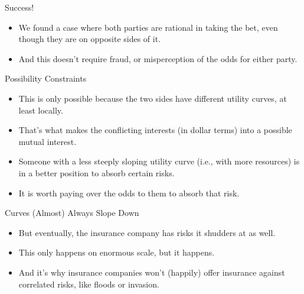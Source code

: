 \documentclass[
  ignorenonframetext,
]{beamer}
\providecommand{\tightlist}{%
  \setlength{\itemsep}{0pt}\setlength{\parskip}{0pt}}
\renewcommand{\,}{\text{, }}
\begin{document}
\begin{frame}{Success!}
\protect\hypertarget{success}{}

\begin{itemize}
\tightlist
\item
  We found a case where both parties are rational in taking the bet,
  even though they are on opposite sides of it.
\item
  And this doesn't require fraud, or misperception of the odds for
  either party.
\end{itemize}

\end{frame}

\begin{frame}{Possibility Constraints}
\protect\hypertarget{possibility-constraints-1}{}

\begin{itemize}
\tightlist
\item
  This is only possible because the two sides have different utility
  curves, at least locally.
\item
  That's what makes the conflicting interests (in dollar terms) into a
  possible mutual interest.
\item
  Someone with a less steeply sloping utility curve (i.e., with more
  resources) is in a better position to absorb certain risks.
\item
  It is worth paying over the odds to them to absorb that risk.
\end{itemize}

\end{frame}

\begin{frame}{Curves (Almost) Always Slope Down}
\protect\hypertarget{curves-almost-always-slope-down-1}{}

\begin{itemize}
\tightlist
\item
  But eventually, the insurance company has risks it shudders at as
  well.
\item
  This only happens on enormous scale, but it happens.
\item
  And it's why insurance companies won't (happily) offer insurance
  against correlated risks, like floods or invasion.
\end{itemize}

\end{frame}
\end{document}
